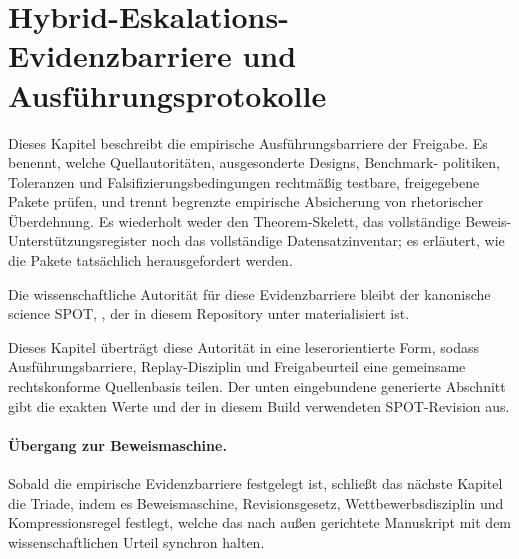 \section{Hybrid-Eskalations-Evidenzbarriere und Ausführungsprotokolle}
\label{sec:oc-core-1-3-empirical-execution-protocols}

Dieses Kapitel beschreibt die empirische Ausführungsbarriere der Freigabe.
Es benennt, welche Quellautoritäten, ausgesonderte Designs, Benchmark-
politiken, Toleranzen und Falsifizierungsbedingungen rechtmäßig testbare,
freigegebene Pakete prüfen, und trennt begrenzte empirische Absicherung von
rhetorischer Überdehnung. Es wiederholt weder den Theorem-Skelett, das
vollständige Beweis-Unterstützungsregister noch das vollständige
Datensatzinventar; es erläutert, wie die Pakete tatsächlich herausgefordert
werden.

Die wissenschaftliche Autorität für diese Evidenzbarriere bleibt der
kanonische science SPOT, , der in diesem
Repository unter
materialisiert ist.

Dieses Kapitel überträgt diese Autorität in eine leserorientierte Form,
sodass Ausführungsbarriere, Replay-Disziplin und Freigabeurteil eine
gemeinsame rechtskonforme Quellenbasis teilen. Der unten eingebundene generierte
Abschnitt gibt die exakten Werte  und
 der in diesem Build verwendeten SPOT-Revision aus.

\begingroup
\small

\endgroup

\paragraph{Übergang zur Beweismaschine.}
Sobald die empirische Evidenzbarriere festgelegt ist, schließt das nächste
Kapitel die Triade, indem es Beweismaschine, Revisionsgesetz,
Wettbewerbsdisziplin und Kompressionsregel festlegt, welche das nach außen
gerichtete Manuskript mit dem wissenschaftlichen Urteil synchron halten.
